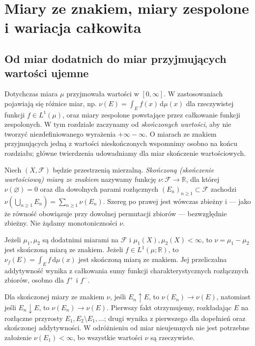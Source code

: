 \chapter[Miary ze znakiem i zespolone]{Miary ze znakiem, miary zespolone i wariacja całkowita}
\label{ch:miary-ze-znakiem}

\providecommand{\atlasref}[2]{#2}


\section{Od miar dodatnich do miar przyjmujących wartości ujemne}
Dotychczas miara $\mu$ przyjmowała wartości w $[0,\infty]$.
W zastosowaniach pojawiają się różnice miar, np.
$\nu(E)=\int_E f(x)\,\mathrm d\mu(x)$ dla rzeczywistej
funkcji $f\in L^1(\mu)$, oraz miary zespolone
powstające przez całkowanie funkcji zespolonych.
W tym rozdziale zaczynamy od \emph{skończonych wartości},
aby nie tworzyć niezdefiniowanego wyrażenia $+\infty-\infty$.
O miarach ze znakiem przyjmujących jedną z wartości
nieskończonych wspomnimy osobno na końcu rozdziału;
główne twierdzenia udowadniamy dla miar skończenie wartościowych.

\begin{definicja}
\label{def:signed-measure-16}
Niech $(X,\mathcal F)$ będzie przestrzenią mierzalną.
\emph{Skończoną (skończenie wartościową) miarą ze znakiem}
nazywamy funkcję $\nu:\mathcal F\to\mathbb R$, dla której
$\nu(\varnothing)=0$ oraz dla dowolnych parami rozłącznych
$(E_n)_{n\ge1}\subset\mathcal F$ zachodzi
$\nu(\bigcup_{n\ge1}E_n)=\sum_{n\ge1}\nu(E_n)$.
Szereg po prawej jest wówczas zbieżny i — jako że równość
obowiązuje przy dowolnej permutacji zbiorów — bezwzględnie
zbieżny. Nie żądamy monotoniczności $\nu$.
\end{definicja}

\begin{przyklad}
Jeżeli $\mu_1,\mu_2$ są dodatnimi miarami na $\mathcal F$
i $\mu_1(X),\mu_2(X)<\infty$, to $\nu=\mu_1-\mu_2$
jest skończoną miarą ze znakiem.
Jeżeli $f\in L^1(\mu;\mathbb R)$, to
$\nu_f(E)=\int_E f\,\mathrm d\mu(x)$ jest skończoną miarą ze znakiem.
Jej przeliczalna addytywność wynika z całkowania sumy
funkcji charakterystycznych rozłącznych zbiorów, osobno dla $f^+$ i $f^-$.
\end{przyklad}

\begin{uwaga}
Dla skończonej miary ze znakiem $\nu$, jeśli
$E_n\uparrow E$, to $\nu(E_n)\to\nu(E)$, natomiast
jeśli $E_n\downarrow E$, to $\nu(E_n)\to\nu(E)$.
Pierwszy fakt otrzymujemy, rozkładając $E$ na rozłączne
przyrosty $E_1,E_2\setminus E_1,\dots$; drugi wynika
z pierwszego dla dopełnień oraz skończonej addytywności.
W odróżnieniu od miar nieujemnych nie jest potrzebne
założenie $\nu(E_1)<\infty$, bo wszystkie wartości
$\nu$ są rzeczywiste.
\end{uwaga}

